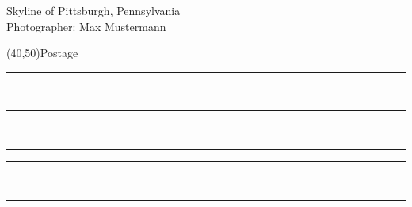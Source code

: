 \documentclass[a6paper,landscape,7pt]{scrartcl}
\begin{document}
\begin{multicols}{2}
    Skyline of Pittsburgh, Pennsylvania\\
    {\small Photographer: Max Mustermann}
    \columnbreak\par
    \vspace*{0cm}
    \hfill\framebox(40,50){\scriptsize Postage}\hspace*{1cm}\par
    \vspace{0.2\textheight}
    \rule{6.0cm}{0.01cm}\vspace*{1cm}\\ %
    \rule{6.0cm}{0.01cm}\vspace*{1cm}\\ %
    \rule{2.2cm}{0.01cm}\hspace*{0.2cm}\rule{3.6cm}{0.01cm}\vspace*{1cm}\\ %
    \rule{6.0cm}{0.01cm}\\ %
\end{multicols} 
\end{document}

